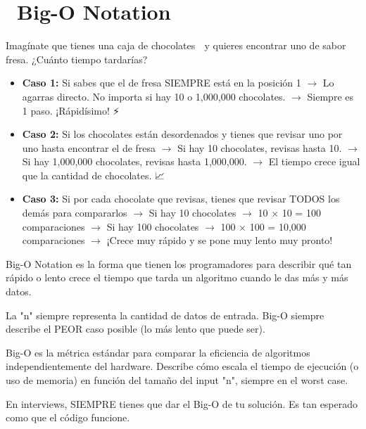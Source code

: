 ﻿\chapter[\emj{⏱️}~Big-O Notation]{~Big-O Notation}

\begin{dsaquees}

Imagínate que tienes una caja de chocolates 🍫 y quieres
encontrar uno de sabor fresa. ¿Cuánto tiempo tardarías?

\begin{itemize}
    \item \textbf{Caso 1:} Si sabes que el de fresa SIEMPRE está en la posición 1
          $\rightarrow$ Lo agarras directo. No importa si hay 10 o 1,000,000 chocolates.
          $\rightarrow$ Siempre es 1 paso. ¡Rápidísimo! ⚡

    \item \textbf{Caso 2:} Si los chocolates están desordenados y tienes que revisar
          uno por uno hasta encontrar el de fresa
          $\rightarrow$ Si hay 10 chocolates, revisas hasta 10.
          $\rightarrow$ Si hay 1,000,000 chocolates, revisas hasta 1,000,000.
          $\rightarrow$ El tiempo crece igual que la cantidad de chocolates. 📈

    \item \textbf{Caso 3:} Si por cada chocolate que revisas, tienes que revisar
          TODOS los demás para compararlos
          $\rightarrow$ Si hay 10 chocolates $\rightarrow$ 10 $\times$ 10 = 100 comparaciones
          $\rightarrow$ Si hay 100 chocolates $\rightarrow$ 100 $\times$ 100 = 10,000 comparaciones
          $\rightarrow$ ¡Crece muy rápido y se pone muy lento muy pronto! 🐌
\end{itemize}

Big-O Notation es la forma que tienen los programadores para
describir qué tan rápido o lento crece el tiempo que tarda
un algoritmo cuando le das más y más datos.

La "n" siempre representa la cantidad de datos de entrada.
Big-O siempre describe el PEOR caso posible (lo más lento que puede ser).

\end{dsaquees}

\begin{dsaotraforma}

Big-O es la métrica estándar para comparar la eficiencia de
algoritmos independientemente del hardware. Describe cómo
escala el tiempo de ejecución (o uso de memoria) en función
del tamaño del input "n", siempre en el worst case.

En interviews, SIEMPRE tienes que dar el Big-O de tu solución.
Es tan esperado como que el código funcione.

\end{dsaotraforma}

